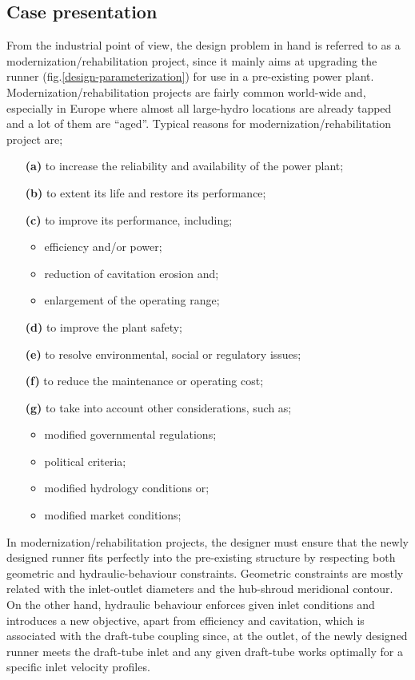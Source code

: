 \subsection{Case presentation}
From the industrial point of view, the design problem in hand is referred to as a modernization/rehabilitation project, since it mainly aims at upgrading the runner (fig.\ref{design-parameterization}) for use in a pre-existing power plant. Modernization/rehabilitation projects are fairly common world-wide and, especially in Europe where almost all large-hydro locations are already tapped and a lot of them are ``aged''. Typical reasons for modernization/rehabilitation project are;
\begin{itemize}
\item[\textbf{(a)}] to increase the reliability and availability of the power plant; 
\item[\textbf{(b)}] to extent its life and restore its performance; 
\item[\textbf{(c)}] to improve its performance, including;
\begin{itemize}
	\item efficiency and/or power;
    \item reduction of cavitation erosion and;
	\item enlargement of the operating range;
\end{itemize}
\item[\textbf{(d)}] to improve the plant safety;
\item[\textbf{(e)}] to resolve environmental, social or regulatory issues;
\item[\textbf{(f)}] to reduce the maintenance or operating cost;
\item[\textbf{(g)}] to take into account other considerations, such as;
\begin{itemize}
	\item modified governmental regulations;
	\item political criteria;
	\item modified hydrology conditions or;
	\item modified market conditions;
\end{itemize}
\end{itemize}

In modernization/rehabilitation projects, the designer must ensure that the newly designed runner fits perfectly into the pre-existing structure by respecting both geometric and hydraulic-behaviour constraints. Geometric constraints are mostly related with the inlet-outlet diameters and the hub-shroud meridional contour. On the other hand, hydraulic behaviour enforces given inlet conditions and introduces a new objective, apart from efficiency and cavitation,  which is associated with the draft-tube coupling since, at the outlet, of the newly designed runner meets the draft-tube inlet and any given draft-tube works optimally for a specific inlet velocity profiles.      
  
